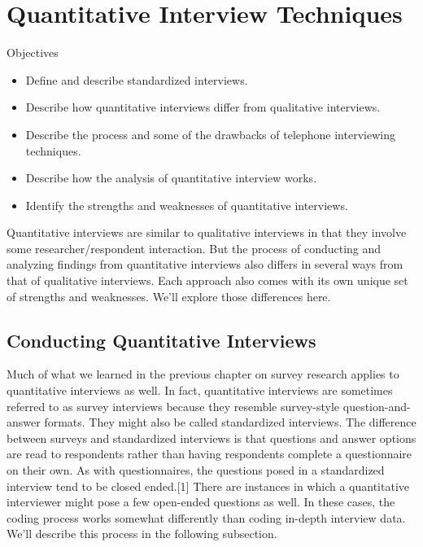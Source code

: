 \section{Quantitative Interview Techniques}

\begin{center}
	\begin{objbox}{Objectives}
		\begin{itemize}
			\setlength{\itemsep}{0pt}
			\setlength{\parskip}{0pt}
			\setlength{\parsep}{0pt}
			
			\item Define and describe standardized interviews.
			\item Describe how quantitative interviews differ from qualitative interviews.
			\item Describe the process and some of the drawbacks of telephone interviewing techniques.
			\item Describe how the analysis of quantitative interview works.
			\item Identify the strengths and weaknesses of quantitative interviews.
			
		\end{itemize}
	\end{objbox}
\end{center}

Quantitative interviews are similar to qualitative interviews in that they involve some researcher/respondent interaction. But the process of conducting and analyzing findings from quantitative interviews also differs in several ways from that of qualitative interviews. Each approach also comes with its own unique set of strengths and weaknesses. We’ll explore those differences here.

\subsection{Conducting Quantitative Interviews}

Much of what we learned in the previous chapter on survey research applies to quantitative interviews as well. In fact, quantitative interviews are sometimes referred to as survey interviews because they resemble survey-style question-and-answer formats. They might also be called standardized interviews. The difference between surveys and standardized interviews is that questions and answer options are read to respondents rather than having respondents complete a questionnaire on their own. As with questionnaires, the questions posed in a standardized interview tend to be closed ended.[1] There are instances in which a quantitative interviewer might pose a few open-ended questions as well. In these cases, the coding process works somewhat differently than coding in-depth interview data. We’ll describe this process in the following subsection.

